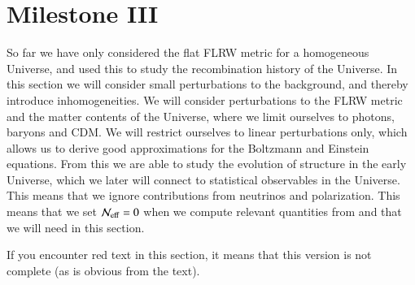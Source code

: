 \section{Milestone III}\label{sec:M3}
So far we have only considered the flat FLRW metric for a homogeneous Universe, and used this to study the recombination history of the Universe. In this section we will consider small perturbations to the background, and thereby introduce inhomogeneities. We will consider perturbations to the FLRW metric and the matter contents of the Universe, where we limit ourselves to photons, baryons and CDM. We will restrict ourselves to linear perturbations only, which allows us to derive good approximations for the Boltzmann and Einstein equations. From this we are able to study the evolution of structure in the early Universe, which we later will connect to statistical observables in the Universe. This means that we ignore contributions from neutrinos and polarization. This means that we set $\mathcal{N}_\mathrm{eff}=0$ when we compute relevant quantities from  and  that we will need in this section.    

If you encounter red text in this section, it means that this version is not complete (as is obvious from the text). 






 